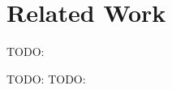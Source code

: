\section{Related Work}
TODO: \cite{collier_test-driven_2013}

TODO: \cite{perez_back_2017}
TODO: \cite{perez_testing_2017}
